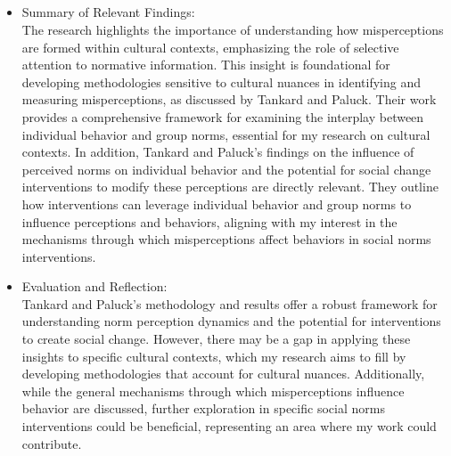 \documentclass{article}
\begin{document}
\subsection{}
\begin{itemize}
    \item Summary of Relevant Findings:\\
The research highlights the importance of understanding how misperceptions are formed within cultural contexts, emphasizing the role of selective attention to normative information. This insight is foundational for developing methodologies sensitive to cultural nuances in identifying and measuring misperceptions, as discussed by Tankard and Paluck. Their work provides a comprehensive framework for examining the interplay between individual behavior and group norms, essential for my research on cultural contexts. In addition, Tankard and Paluck's findings on the influence of perceived norms on individual behavior and the potential for social change interventions to modify these perceptions are directly relevant. They outline how interventions can leverage individual behavior and group norms to influence perceptions and behaviors, aligning with my interest in the mechanisms through which misperceptions affect behaviors in social norms interventions.
\end{itemize}
\begin{itemize}
    \item Evaluation and Reflection:\\
Tankard and Paluck's methodology and results offer a robust framework for understanding norm perception dynamics and the potential for interventions to create social change. However, there may be a gap in applying these insights to specific cultural contexts, which my research aims to fill by developing methodologies that account for cultural nuances. Additionally, while the general mechanisms through which misperceptions influence behavior are discussed, further exploration in specific social norms interventions could be beneficial, representing an area where my work could contribute.
\end{itemize}
\end{document}
